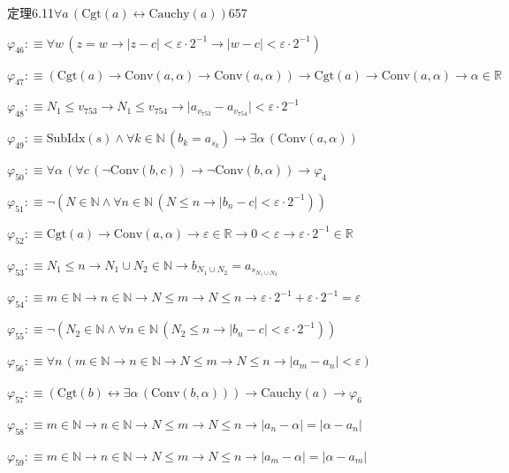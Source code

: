 \begin{fullproof}{定理6.11}{$\forall a\,(\mathrm{Cgt}(a) \leftrightarrow \mathrm{Cauchy}(a))$}{657}
\begin{abbrevlist}
\item $\varphi_{46} :\equiv \forall w\,(z = w \to \lvert z - c \rvert < \varepsilon \cdot 2^{-1} \to \lvert w - c \rvert < \varepsilon \cdot 2^{-1})$
\item $\varphi_{47} :\equiv (\mathrm{Cgt}(a) \to \mathrm{Conv}(a,\alpha) \to \mathrm{Conv}(a,\alpha)) \to \mathrm{Cgt}(a) \to \mathrm{Conv}(a,\alpha) \to \alpha \in \mathbb{R}$
\item $\varphi_{48} :\equiv N_{1} \leq v_{753} \to N_{1} \leq v_{754} \to \lvert a_{v_{753}} - a_{v_{754}} \rvert < \varepsilon \cdot 2^{-1}$
\item $\varphi_{49} :\equiv \mathrm{SubIdx}(s) \land \forall k \in \mathbb{N}\,(b_{k} = a_{s_{k}}) \to \exists \alpha\,(\mathrm{Conv}(a,\alpha))$
\item $\varphi_{50} :\equiv \forall \alpha\,(\forall c\,(\neg \mathrm{Conv}(b,c)) \to \neg \mathrm{Conv}(b,\alpha)) \to \varphi_{4}$
\item $\varphi_{51} :\equiv \neg (N \in \mathbb{N} \land \forall n \in \mathbb{N}\,(N \leq n \to \lvert b_{n} - c \rvert < \varepsilon \cdot 2^{-1}))$
\item $\varphi_{52} :\equiv \mathrm{Cgt}(a) \to \mathrm{Conv}(a,\alpha) \to \varepsilon \in \mathbb{R} \to 0 < \varepsilon \to \varepsilon \cdot 2^{-1} \in \mathbb{R}$
\item $\varphi_{53} :\equiv N_{1} \leq n \to N_{1} \cup N_{2} \in \mathbb{N} \to b_{N_{1} \cup N_{2}} = a_{s_{N_{1} \cup N_{2}}}$
\item $\varphi_{54} :\equiv m \in \mathbb{N} \to n \in \mathbb{N} \to N \leq m \to N \leq n \to \varepsilon \cdot 2^{-1} + \varepsilon \cdot 2^{-1} = \varepsilon$
\item $\varphi_{55} :\equiv \neg (N_{2} \in \mathbb{N} \land \forall n \in \mathbb{N}\,(N_{2} \leq n \to \lvert b_{n} - c \rvert < \varepsilon \cdot 2^{-1}))$
\item $\varphi_{56} :\equiv \forall n\,(m \in \mathbb{N} \to n \in \mathbb{N} \to N \leq m \to N \leq n \to \lvert a_{m} - a_{n} \rvert < \varepsilon)$
\item $\varphi_{57} :\equiv (\mathrm{Cgt}(b) \leftrightarrow \exists \alpha\,(\mathrm{Conv}(b,\alpha))) \to \mathrm{Cauchy}(a) \to \varphi_{6}$
\item $\varphi_{58} :\equiv m \in \mathbb{N} \to n \in \mathbb{N} \to N \leq m \to N \leq n \to \lvert a_{n} - \alpha \rvert = \lvert \alpha - a_{n} \rvert$
\item $\varphi_{59} :\equiv m \in \mathbb{N} \to n \in \mathbb{N} \to N \leq m \to N \leq n \to \lvert a_{m} - \alpha \rvert = \lvert \alpha - a_{m} \rvert$

\end{abbrevlist}
\end{fullproof}

